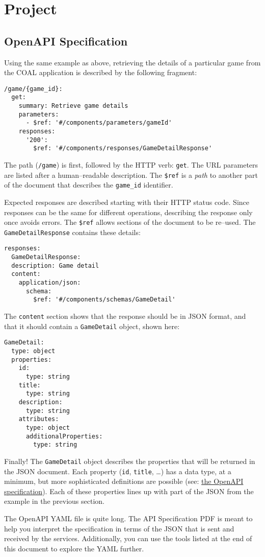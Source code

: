\documentclass{article}
\newcommand{\enterProblemHeader}[1]{
}
\newcommand{\exitProblemHeader}[1]{
\nobreak\extramarks{#1}{}\nobreak
}
\newcounter{homeworkProblemCounter} %
\newcommand{\homeworkProblemName}{}
\newenvironment{homeworkProblem}[1][Problem \arabic{homeworkProblemCounter}]{ %
\stepcounter{homeworkProblemCounter} %
\renewcommand{\homeworkProblemName}{#1} %
\section{\homeworkProblemName} %
\enterProblemHeader{\homeworkProblemName} %
}{
\exitProblemHeader{\homeworkProblemName} %
}
\newcommand{\homeworkSectionName}{}
\newenvironment{homeworkSection}[1]{ %
\renewcommand{\homeworkSectionName}{#1} %
\subsection{\homeworkSectionName} %
\enterProblemHeader{\homeworkProblemName\ [\homeworkSectionName]} %
}{
\enterProblemHeader{\homeworkProblemName} %
}
\begin{document}
\begin{homeworkProblem}[Project]
\begin{homeworkSection}{OpenAPI Specification}
	Using the same example as above, retrieving the details of a particular game from the COAL application is described by the following fragment:
\begin{verbatim}
/game/{game_id}:
  get:
    summary: Retrieve game details
    parameters:
      - $ref: '#/components/parameters/gameId'
    responses:
      '200':
        $ref: '#/components/responses/GameDetailResponse'
\end{verbatim}

The path (\texttt{/game}) is first, followed by the HTTP verb: \texttt{get}. The URL parameters are listed after a human--readable description. The \texttt{\$ref} is a \textit{path} to another part of the document that describes the \texttt{game\_id} identifier.

Expected responses are described starting with their HTTP status code. Since responses can be the same for different operations, describing the response only once avoids errors. The \texttt{\$ref} allows sections of the document to be re--used. The \texttt{GameDetailResponse} contains these details:

\begin{verbatim}
responses:
  GameDetailResponse:
  description: Game detail
  content:
    application/json:
      schema:
        $ref: '#/components/schemas/GameDetail'
\end{verbatim}

The \texttt{content} section shows that the response should be in JSON format, and that it should contain a \texttt{GameDetail} object, shown here:

\begin{verbatim}
GameDetail:
  type: object
  properties:
    id:
      type: string
    title:
      type: string
    description:
      type: string
    attributes:
      type: object
      additionalProperties:
        type: string
\end{verbatim}

Finally! The \texttt{GameDetail} object describes the properties that will be returned in the JSON document. Each property (\texttt{id}, \texttt{title}, \dots) has a data type, at a minimum, but more sophisticated definitions are possible (see: \href{https://swagger.io/specification/}{the OpenAPI specification}). Each of these properties lines up with part of the JSON from the example in the previous section.

The OpenAPI YAML file is quite long. The API Specification PDF is meant to help you interpret the specification in terms of the JSON that is sent and received by the services. Additionally, you can use the tools listed at the end of this document to explore the YAML further.


\end{homeworkSection}
\end{homeworkProblem}
\end{document}

